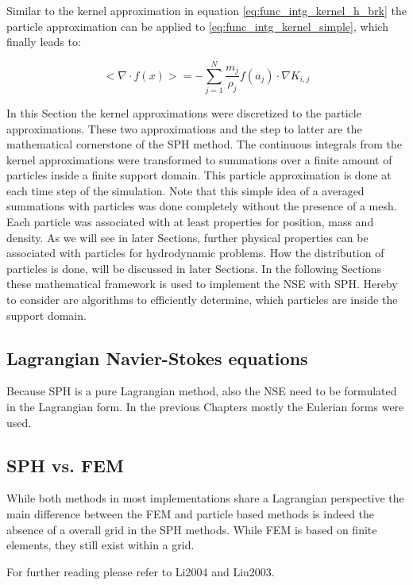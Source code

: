 Similar to the kernel approximation in equation \ref{eq:func_intg_kernel_h_brk} the particle approximation can be applied to \ref{eq:func_intg_kernel_simple}, which finally leads to:

\begin{equation} \label{eq:kernel2_to_part_clean}
< \nabla \cdot f(x) > = 
- \sum_{j=1}^{N} \frac{m_{j}}{\rho_{j}}  f(a_{j}) \cdot \nabla K_{i,j}
\end{equation}

In this Section the kernel approximations were discretized to the particle approximations. These two approximations and the step to latter are the mathematical cornerstone of the SPH method. The continuous integrals from the kernel approximations were transformed to summations over a finite amount of particles inside a finite support domain. This particle approximation is done at each time step of the simulation. Note that this simple idea of a averaged summations with particles was done completely without the presence of a mesh. Each particle was associated with at least properties for position, mass and density. As we will see in later Sections, further physical properties can be associated with particles for hydrodynamic problems. How the distribution of particles is done, will be discussed in later Sections. In the following Sections these mathematical framework is used to implement the NSE with SPH. Hereby to consider are algorithms to efficiently determine, which particles are inside the support domain.



\subsection{Lagrangian Navier-Stokes equations}
Because SPH is a pure Lagrangian method, also the NSE need to be formulated in the Lagrangian form. In the previous Chapters mostly the Eulerian forms were used. 

\subsection{SPH vs. FEM}
While both methods in most implementations share a Lagrangian perspective the main difference between the
FEM and particle based methods is indeed the absence of a overall grid in the SPH methods. While FEM is based
on finite elements, they still exist within a grid.

For further reading please refer to Li2004 and Liu2003.

